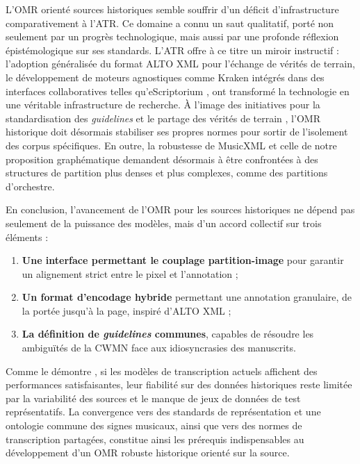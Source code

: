 \documentclass[final,fra]{anthology-ch} %
\begin{document}
L'OMR orienté sources historiques semble souffrir d'un déficit d'infrastructure comparativement à l'ATR. Ce domaine a connu un saut qualitatif, porté non seulement par un progrès technologique, mais aussi par une profonde réflexion épistémologique sur ses standards. L'ATR offre à ce titre un miroir instructif : l'adoption généralisée du format ALTO XML pour l'échange de vérités de terrain, le développement de moteurs agnostiques comme Kraken intégrés dans des interfaces collaboratives telles qu'eScriptorium \cite{kiessling_kraken_2025, stokes_escriptorium_2021}, ont transformé la technologie en une véritable infrastructure de recherche. À l'image des initiatives pour la standardisation des \textit{guidelines} et le partage des vérités de terrain \cite{clerice_catmus_2024-1, chague_htr-united_2022}, l'OMR historique doit désormais stabiliser ses propres normes pour sortir de l'isolement des corpus spécifiques. En outre, la robustesse de MusicXML et celle de notre proposition graphématique demandent désormais à être confrontées à des structures de partition plus denses et plus complexes, comme des partitions d'orchestre.

En conclusion, l'avancement de l'OMR pour les sources historiques ne dépend pas seulement de la puissance des modèles, mais d'un accord collectif sur trois éléments : 
\begin{enumerate} 
    \item \textbf{Une interface permettant le couplage partition-image} pour garantir un alignement strict entre le pixel et l'annotation ; 
    \item \textbf{Un format d'encodage hybride} permettant une annotation granulaire, de la portée jusqu'à la page, inspiré d'ALTO XML ; 
    \item \textbf{La définition de \textit{guidelines} communes}, capables de résoudre les ambiguïtés de la CWMN face aux idiosyncrasies des manuscrits. 
\end{enumerate}

Comme le démontre \textcite{kiessling_transcription_2025}, si les modèles de transcription actuels affichent des performances satisfaisantes, leur fiabilité sur des données historiques reste limitée par la variabilité des sources et le manque de jeux de données de test représentatifs. La convergence vers des standards de représentation et une ontologie commune des signes musicaux, ainsi que vers des normes de transcription partagées, constitue ainsi les prérequis indispensables au développement d'un OMR robuste historique orienté sur la source.



\printbibliography
\end{document}
